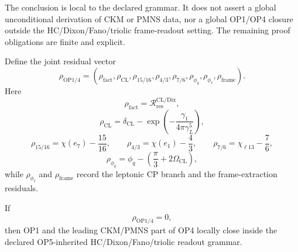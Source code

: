 \begin{remark}
The conclusion is local to the declared grammar.  It does not assert a global unconditional derivation of CKM or PMNS data, nor a global OP1/OP4 closure outside the HC/Dixon/Fano/triolic frame-readout setting.  The remaining proof obligations are finite and explicit.
\end{remark}

\begin{definition}
Define the joint residual vector
\[
  \rho_{\mathrm{OP1/4}}
  =
  (
    \rho_{\mathrm{fact}},
    \rho_{\mathrm{CL}},
    \rho_{15/16},
    \rho_{4/3},
    \rho_{7/6},
    \rho_{\phi_q},
    \rho_{\phi_\ell},
    \rho_{\mathrm{frame}}
  ).
\]
Here
\[
  \rho_{\mathrm{fact}}
  =
  \mathcal R_{\mathrm{res}}^{\mathrm{CL/Dix}},
\]
\[
  \rho_{\mathrm{CL}}
  =
  \delta_{\mathrm{CL}}
  -
  \exp\left(
    -\frac{\gamma_1}{4\pi\gamma_L^5}
  \right),
\]
\[
  \rho_{15/16}
  =
  \chi(e_7)-\frac{15}{16},
\qquad
  \rho_{4/3}
  =
  \chi(e_1)-\frac43,
\qquad
  \rho_{7/6}
  =
  \chi_{\ell13}-\frac76,
\]
\[
  \rho_{\phi_q}
  =
  \phi_q-\left(\frac{\pi}{3}+2\Omega_{\mathrm{CL}}\right),
\]
while \(\rho_{\phi_\ell}\) and \(\rho_{\mathrm{frame}}\) record the leptonic CP branch and the frame-extraction residuals.
\end{definition}

\begin{remark}
If
\[
  \rho_{\mathrm{OP1/4}}=0,
\]
then OP1 and the leading CKM/PMNS part of OP4 locally close inside the declared OP5-inherited HC/Dixon/Fano/triolic readout grammar.
\end{remark}
